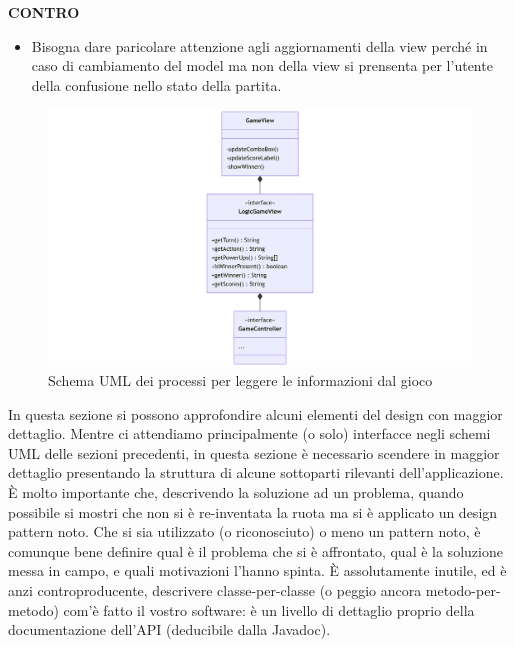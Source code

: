 \documentclass[a4paper,12pt]{report}
\begin{document}
\textbf{CONTRO}
\begin{itemize}
	\item Bisogna dare paricolare attenzione agli aggiornamenti della view perché in caso di cambiamento del model ma non della view si prensenta per l'utente della confusione 
	nello stato della partita.
\end{itemize}
\begin{figure}[H]
	\centering{}
	\includegraphics[width=14cm]{img/TraduzioneInformazioni.png}
	\caption{Schema UML dei processi per leggere le informazioni dal gioco}
	\label{img:Traduzione Informazioni}
\end{figure}

In questa sezione si possono approfondire alcuni elementi del design con maggior dettaglio.
%
Mentre ci attendiamo principalmente (o solo) interfacce negli schemi UML delle sezioni precedenti,
in questa sezione è necessario scendere in maggior dettaglio presentando la struttura di alcune sottoparti rilevanti dell'applicazione.
%
È molto importante che, descrivendo la soluzione ad un problema, quando possibile si mostri che non si è re-inventata la ruota ma si è applicato un design pattern noto.
%
Che si sia utilizzato (o riconosciuto) o meno un pattern noto, è comunque bene definire qual è il problema che si è affrontato, qual è la soluzione messa in campo, e quali motivazioni l'hanno spinta.
%
È assolutamente inutile, ed è anzi controproducente, descrivere classe-per-classe (o peggio ancora metodo-per-metodo) com'è fatto il vostro software: è un livello di dettaglio proprio della documentazione dell'API (deducibile dalla Javadoc).
\end{document}

